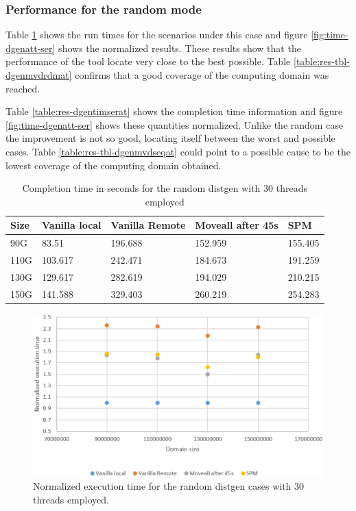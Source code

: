 \subsubsection{Performance for the random mode}\label{subsection:time-dgenat-random.eps}

Table \ref{table:res-dgentimrdmat} shows the run times for the scenarios under this case and figure \ref{fig:time-dgenatt-ser} shows the normalized results. These results show that the performance of the tool locate very close to the best possible. Table \ref{table:res-tbl-dgenmvdrdmat} confirms that a good coverage of the computing domain was reached.

Table \ref{table:res-dgentimserat} shows the completion time information and figure \ref{fig:time-dgenatt-ser} shows these quantities normalized. Unlike the random case the improvement is not so good, locating itself between the worst and possible cases. Table \ref{table:res-tbl-dgenmvdseqat} could point to a possible cause to be the lowest coverage of the computing domain obtained.

\begin{table}[th]
	\centering
		\begin{tabularx}{\textwidth}{|l|l|l|l|X|}
		\hline
			Size & Vanilla local & Vanilla Remote & Moveall after 45s & SPM \\
			\hline
			90G & 83.51 & 196.688 & 152.959 & 155.405\\
			\hline
			110G & 103.617 & 242.471 & 184.673 & 191.259\\
			\hline
			130G & 129.617 & 282.619 &194.029 & 210.215\\
			\hline
			150G & 141.588 & 329.403 & 260.219 & 254.283\\
			\hline
		\end{tabularx}
		\caption{Completion time in seconds for the random distgen with 30 threads employed}
		\label{table:res-dgentimrdmat}
\end{table}

\begin{figure}[th]
	\centering
		\includegraphics[width=.8\textwidth]{figures/time-dgenat-random.eps}
		\caption{Normalized execution time for the random distgen cases with 30 threads employed.}
		\label{fig:res-dgentimrdmat}
\end{figure}



